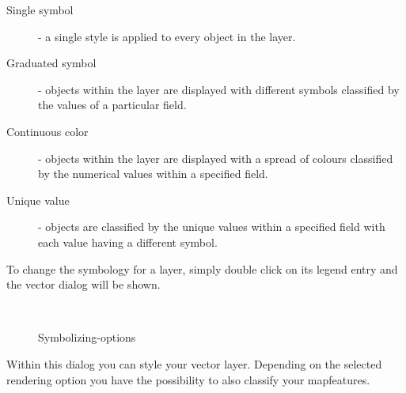 \begin{description} 
    \item[Single symbol] - a single style is applied to every
    object in the layer.
    \item[Graduated symbol] - objects within the layer are
    displayed with different symbols classified by the values of a
    particular field.
    \item[Continuous color] - objects within the layer are
    displayed with a spread of colours classified by the numerical
    values within a specified field.
    \item[Unique value] - objects are classified by the unique
    values within a specified field with each value having a
    different symbol.
\end{description}

To change the symbology for a layer, simply double click on its legend 
entry and the vector  dialog will be 
shown.

\begin{figure}[h]
\centering
\caption{Symbolizing-options \nixcaption}
   \goodgap
   \\
   \goodgap
\end{figure}


 \label{sec:style_options} 
Within this dialog you can style your vector layer. Depending on the selected
rendering option you have the possibility to also classify your mapfeatures.

